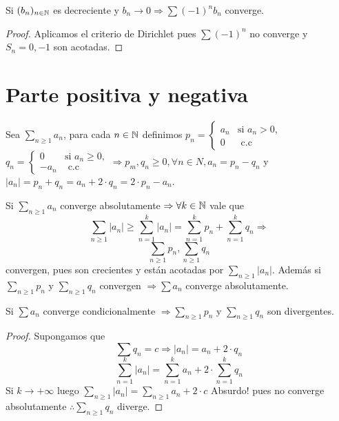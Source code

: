 \begin{corollary}
  Si $(b_n)_{n \in \mathbb{N}}$ es decreciente y $ b_n \to 0 \Rightarrow \sum (-1)^n b_n$ converge.
  \begin{proof}
    Aplicamos el criterio de Dirichlet pues $\sum (-1)^n$ no converge y $S_n = 0, -1$ son acotadas.
  \end{proof}
\end{corollary}

\section{Parte positiva y negativa}

\begin{definition}
  Sea $\sum_{n \geq 1} a_n$, para cada $n \in \mathbb{N}$ definimos $p_n = \begin{cases}
      a_n & \text{si } a_n > 0, \\
      0   & \text{ c.c }
    \end{cases}$ \\
  $q_n = \begin{cases}
      0    & \text{si } a_n \geq 0, \\
      -a_n & \text{ c.c }
    \end{cases} \Rightarrow p_m, q_n \geq 0, \forall n \in N, a_n = p_n - q_n$ y $|a_n| = p_n + q_n = a_n + 2 \cdot q_n = 2 \cdot p_n - a_n$.
\end{definition}

\begin{note}
  Si $\sum_{n \geq 1} a_n$ converge absolutamente $\Rightarrow \forall k \in \mathbb{N}$ vale que \begin{equation}
    \sum_{n \geq 1} |a_n| \geq \sum_{n = 1}^k |a_n| = \sum_{n = 1}^k p_n + \sum_{n = 1}^k q_n \Rightarrow
  \end{equation} \begin{equation}
    \sum_{n \geq 1} p_n, \sum_{n \geq 1} q_n
  \end{equation} convergen, pues son crecientes y están acotadas por $\sum_{n \geq 1} |a_n|$. Además si $\sum_{n \geq 1} p_n$ y $\sum_{n \geq 1} q_n$ convergen $\Rightarrow \sum a_n$ converge absolutamente.
\end{note}

\begin{theorem}
  Si $\sum a_n$ converge condicionalmente $\Rightarrow \sum_{n \geq 1} p_n$ y $\sum_{n \geq 1} q_n$ son divergentes.

  \begin{proof}
    Supongamos que \begin{equation}
      \sum q_n = c \Rightarrow |a_n| = a_n + 2 \cdot q_n
    \end{equation}
    \begin{equation}
      \sum_{n = 1}^k |a_n| = \sum_{n = 1}^k a_n + 2 \cdot \sum_{n = 1}^k q_n
    \end{equation}
    Si $k \to +\infty$ luego $\sum_{n \geq 1} |a_n| = \sum_{n \geq 1} a_n + 2 \cdot c$ Absurdo! pues no converge absolutamente $\therefore \sum_{n \geq 1} q_n$ diverge.
  \end{proof}
\end{theorem}

